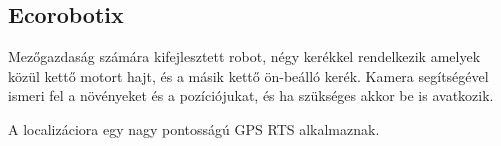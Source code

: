 \renewcommand{\xname}{ecorobotix}
\renewcommand{\x}{2.2}
\renewcommand{\y}{1.70}
\renewcommand{\z}{1.30}
\renewcommand{\img}{MobilisRobotok/EcoRobotix/ecorobotix.jpg}
\renewcommand{\sources}{Forrás: https://www.ecorobotix.com/}
\renewcommand{\captionn}{ecorobotix mezőgazdasági robot}
\renewcommand{\watherProf}{Igen}
\renewcommand{\sebesseg}{1.4}
\renewcommand{\weight}{130}
\renewcommand{\AcAndGy}{Igen}
\renewcommand{\GPS}{Igen, GPS RTK}

\subsection*{Ecorobotix}

Mezőgazdaság számára kifejlesztett robot, négy kerékkel rendelkezik amelyek közül kettő motort hajt, és a másik kettő ön-beálló kerék. Kamera segítségével ismeri fel a növényeket és a pozíciójukat, és ha szükséges akkor be is avatkozik. 

A localizáciora egy nagy pontosságú GPS RTS alkalmaznak.

\renewcommand{\aspectratioPic}{0.5}



